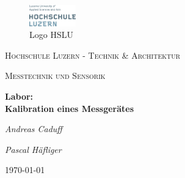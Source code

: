 
\begin{titlepage}
	\centering
	
	\begin{figure}[H]
        \centering
        \includegraphics[width=0.18\textwidth]{pic/logo.png}


        
        \captionsetup{textformat=empty,labelformat=empty} %
        \caption{Logo HSLU}
    \end{figure}

	
	
	\par\vspace{1cm}
	{\scshape\LARGE Hochschule Luzern - Technik \& Architektur\par}
	\vspace{1cm}
	{\scshape\Large Messtechnik und Sensorik\par}
	\vspace{1.5cm}
	{\huge\bfseries Labor:\\ Kalibration eines Messgerätes\par}
	\vspace{2cm}
	{\Large\itshape Andreas Caduff\par}
	{\Large\itshape Pascal Häfliger\par}
	\vfill
	\vspace{1cm}
	
	

	\vfill  %

	{\large \today\par}
\end{titlepage}



\clearpage